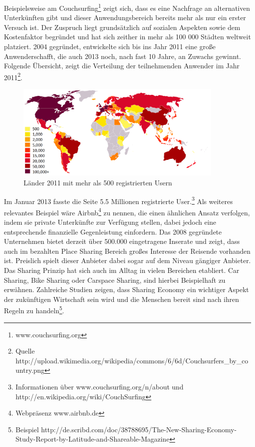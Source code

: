 Beispielsweise am Couchsurfing\footnote{www.couchsurfing.org} zeigt sich, dass es eine Nachfrage an alternativen Unterkünften gibt und dieser Anwendungsbereich bereits mehr als nur ein erster Versuch ist. Der Zuspruch liegt grundsätzlich auf sozialen Aspekten sowie dem Kostenfaktor begründet und hat sich zeither in mehr als 100 000 Städten weltweit platziert. 2004 gegründet, entwickelte sich bis ins Jahr 2011 eine große Anwenderschafft, die auch 2013 noch, nach fast 10 Jahre, an Zuwachs gewinnt. 
Folgende Übersicht, zeigt die Verteilung der teilnehmenden Anwender im Jahr 2011\footnote{Quelle http://upload.wikimedia.org/wikipedia/commons/6/6d/Couchsurfers\_by\_country.png}. 

\begin{figure}[H]
\includegraphics[width=0.9\textwidth]{./images/couchsurfers.png}
\caption{Länder 2011 mit mehr als 500 registrierten Usern} 
\label{Couchsurfer}
\end{figure}


Im Januar 2013 fasste die Seite 5.5 Millionen registrierte User.\footnote{Informationen über www.couchsurfing.org/n/about und http://en.wikipedia.org/wiki/CouchSurfing} Als weiteres relevantes Beispiel wäre Airbnb\footnote{Webpräsenz www.airbnb.de} zu nennen, die einen ähnlichen Ansatz verfolgen, indem sie private Unterkünfte zur Verfügung stellen, dabei jedoch eine entsprechende finanzielle Gegenleistung einfordern.
Das 2008 gegründete Unternehmen bietet derzeit über 500.000 eingetragene Inserate und zeigt, dass auch im bezahlten Place Sharing Bereich großes Interesse der Reisende vorhanden ist. Preislich spielt dieser Anbieter dabei sogar auf dem Niveau gängiger Anbieter.\\

Das Sharing Prinzip hat sich auch im Alltag in vielen Bereichen etabliert.
Car Sharing, Bike Sharing oder Carspace Sharing, sind hierbei Beispielhaft zu erwähnen. Zahlreiche Studien zeigen, dass Sharing Economy ein wichtiger Aspekt der zukünftigen Wirtschaft sein wird und die Menschen bereit sind nach ihren Regeln zu handeln\footnote{Beispiel http://de.scribd.com/doc/38788695/The-New-Sharing-Economy-Study-Report-by-Latitude-and-Shareable-Magazine}.




